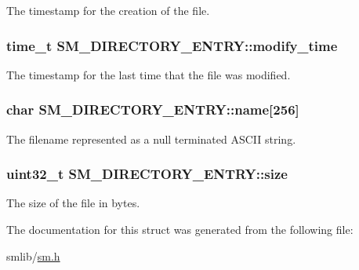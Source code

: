 The timestamp for the creation of the file. 

\hypertarget{struct_s_m___d_i_r_e_c_t_o_r_y___e_n_t_r_y_a283ee97a6a4ef7983e95215ba9567399}{
\subsubsection[{modify\-\_\-time}]{\setlength{\rightskip}{0pt plus 5cm}time\-\_\-t S\-M\-\_\-\-D\-I\-R\-E\-C\-T\-O\-R\-Y\-\_\-\-E\-N\-T\-R\-Y\-::modify\-\_\-time}}\label{struct_s_m___d_i_r_e_c_t_o_r_y___e_n_t_r_y_a283ee97a6a4ef7983e95215ba9567399}


The timestamp for the last time that the file was modified. 

\hypertarget{struct_s_m___d_i_r_e_c_t_o_r_y___e_n_t_r_y_a201f16ecc991fd5d79b6d3efb65ea829}{
\subsubsection[{name}]{\setlength{\rightskip}{0pt plus 5cm}char S\-M\-\_\-\-D\-I\-R\-E\-C\-T\-O\-R\-Y\-\_\-\-E\-N\-T\-R\-Y\-::name\mbox{[}256\mbox{]}}}\label{struct_s_m___d_i_r_e_c_t_o_r_y___e_n_t_r_y_a201f16ecc991fd5d79b6d3efb65ea829}


The filename represented as a null terminated A\-S\-C\-I\-I string. 

\hypertarget{struct_s_m___d_i_r_e_c_t_o_r_y___e_n_t_r_y_ad0e3aad512c47a3d6fe159070cabc86a}{
\subsubsection[{size}]{\setlength{\rightskip}{0pt plus 5cm}uint32\-\_\-t S\-M\-\_\-\-D\-I\-R\-E\-C\-T\-O\-R\-Y\-\_\-\-E\-N\-T\-R\-Y\-::size}}\label{struct_s_m___d_i_r_e_c_t_o_r_y___e_n_t_r_y_ad0e3aad512c47a3d6fe159070cabc86a}


The size of the file in bytes. 



The documentation for this struct was generated from the following file\-:\begin{DoxyCompactItemize}
\item 
smlib/\hyperlink{sm_8h}{sm.\-h}\end{DoxyCompactItemize}
